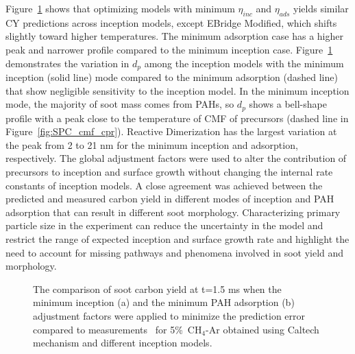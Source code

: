 Figure~\ref{fig:shockagof_yield_maxincads_cpr} shows that optimizing models with minimum $\eta_{inc}$ and $\eta_{ads}$ yields similar CY predictions across inception models, except EBridge Modified, which shifts slightly toward higher temperatures. The minimum adsorption case has a higher peak and narrower profile compared to the minimum inception case. Figure~\ref{fig:shockagof_yield_maxincads_cpr} demonstrates the variation in $d_p$ among the inception models with the minimum inception (solid line) mode compared to the minimum adsorption (dashed line) that show negligible sensitivity to the inception model. In the minimum inception mode, the majority of soot mass comes from PAHs, so $d_p$ shows a bell-shape profile with a peak close to the temperature of CMF of precursors (dashed line in Figure~\ref{fig:SPC_cmf_cpr}). Reactive Dimerization has the largest variation at the peak from 2 to 21 nm for the minimum inception and adsorption, respectively. The global adjustment factors were used to alter the contribution of precursors to inception and surface growth without changing the internal rate constants of inception models. A close agreement was achieved between the predicted and measured carbon yield in different modes of inception and PAH adsorption that can result in different soot morphology. Characterizing primary particle size in the experiment can reduce the uncertainty in the model and restrict the range of expected inception and surface growth rate and highlight the need to account for missing pathways and phenomena involved in soot yield and morphology.

\begin{figure}[H]
	\centering
	\caption{The comparison of soot carbon yield at t=1.5 ms when the minimum inception (a) and the minimum PAH adsorption (b) adjustment factors were applied to minimize the prediction error compared to measurements~\citep{agafonov2016unified} for 5\%~$\mathrm{CH_4}$-Ar obtained using Caltech mechanism and different inception models.}
	\label{fig:shockagof_yield_maxincads_cpr} 
\end{figure}

